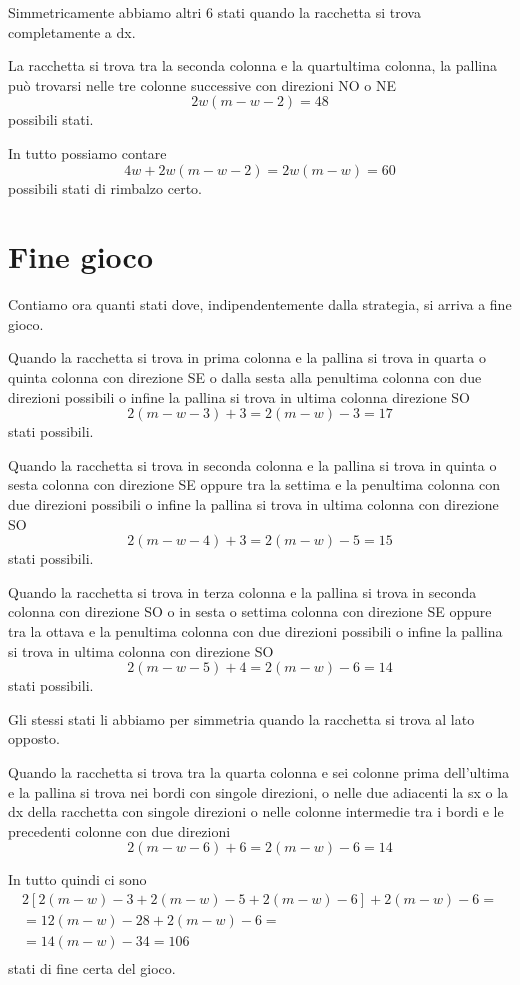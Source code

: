 \documentclass[a4paper,11pt]{article}
\begin{document}
Simmetricamente abbiamo altri 6 stati quando la racchetta si trova completamente a dx.

La racchetta si trova tra la seconda colonna e la quartultima colonna, la pallina può trovarsi nelle tre colonne successive con direzioni NO o NE
\[
2w(m-w-2) = 48
\]
possibili stati.

In tutto possiamo contare 
\[
4w+2w(m-w-2) = 2w(m-w)=60
\]
possibili stati di rimbalzo certo.


\section{Fine gioco}

Contiamo ora quanti stati dove, indipendentemente dalla strategia, si arriva a fine gioco.

Quando la racchetta si trova in prima colonna e la pallina si trova in quarta o quinta colonna con direzione SE o dalla sesta alla penultima colonna con due direzioni possibili o infine la pallina si trova in ultima colonna direzione SO
\[
2(m-w-3)+3=2(m-w)-3=17
\]
stati possibili.

Quando la racchetta si trova in seconda colonna e la pallina si trova in quinta o sesta colonna con direzione SE oppure tra la settima e la penultima colonna con due direzioni possibili o infine la pallina si trova in ultima colonna con direzione SO
\[
2(m-w-4)+3 = 2(m-w)-5 = 15
\]
stati possibili.

Quando la racchetta si trova in terza colonna e la pallina si trova in seconda colonna con direzione SO o in sesta o settima colonna con direzione SE oppure tra la ottava e la penultima colonna con due direzioni possibili o infine la pallina si trova in ultima colonna con direzione SO
\[
2(m-w-5)+4= 2(m-w)-6 = 14
\]
stati possibili.

Gli stessi stati li abbiamo per simmetria quando la racchetta si trova al lato opposto.

Quando la racchetta si trova tra la quarta colonna e sei colonne prima dell'ultima e la pallina si trova nei bordi con singole direzioni, o nelle due adiacenti la sx o la dx della racchetta con singole direzioni o nelle colonne intermedie tra i bordi e le precedenti colonne con due direzioni
\[
2(m-w-6)+6 = 2(m-w)-6=14
\]

In tutto quindi ci sono
\[
\begin{array}{r}
 2[2(m-w)-3+2(m-w)-5+2(m-w)-6]+2(m-w)-6 = \\
 = 12(m-w)-28+2(m-w)-6 = \\
 = 14(m-w)-34 = 106 \\
\end{array}
\] stati di fine certa del gioco.
\end{document}
